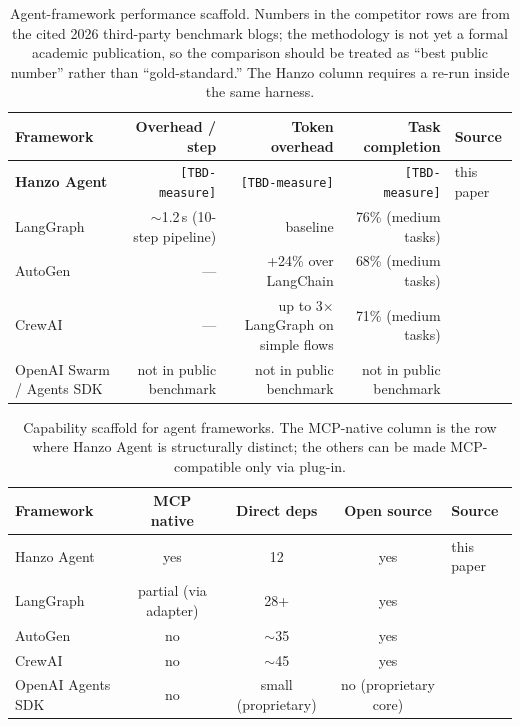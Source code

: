 \begin{table}[H]
\centering
\small
\begin{tabular}{@{}lrrrl@{}}
\toprule
\textbf{Framework} & \textbf{Overhead / step} & \textbf{Token overhead} & \textbf{Task completion} & \textbf{Source} \\
\midrule
\textbf{Hanzo Agent}       & \texttt{[TBD-measure]} & \texttt{[TBD-measure]} & \texttt{[TBD-measure]} & this paper \\
\midrule
LangGraph                  & $\sim$1.2\,s (10-step pipeline) & baseline & 76\% (medium tasks) & \cite{pecollective2026agentframeworks,pooya2026frameworks} \\
AutoGen                    & --- & +24\% over LangChain   & 68\% (medium tasks) & \cite{pecollective2026agentframeworks,pooya2026frameworks} \\
CrewAI                     & --- & up to 3$\times$ LangGraph on simple flows & 71\% (medium tasks) & \cite{pooya2026frameworks} \\
OpenAI Swarm / Agents SDK  & not in public benchmark            & not in public benchmark         & not in public benchmark & \cite{openaiagentssdk} \\
\bottomrule
\end{tabular}
\caption{Agent-framework performance scaffold. Numbers in the competitor
rows are from the cited 2026 third-party benchmark blogs; the methodology
is not yet a formal academic publication, so the comparison should be
treated as ``best public number'' rather than ``gold-standard.'' The
Hanzo column requires a re-run inside the same harness.}
\label{tab:hanzo-agent-comparison}
\end{table}

\begin{table}[H]
\centering
\small
\begin{tabular}{@{}lcccl@{}}
\toprule
\textbf{Framework} & \textbf{MCP native} & \textbf{Direct deps} & \textbf{Open source} & \textbf{Source} \\
\midrule
Hanzo Agent  & yes                & 12              & yes         & this paper \\
LangGraph    & partial (via adapter) & 28+         & yes         & \cite{langgraphgithub} \\
AutoGen      & no                 & $\sim$35        & yes         & \cite{autogengithub} \\
CrewAI       & no                 & $\sim$45        & yes         & \cite{crewaigithub} \\
OpenAI Agents SDK & no            & small (proprietary) & no (proprietary core) & \cite{openaiagentssdk} \\
\bottomrule
\end{tabular}
\caption{Capability scaffold for agent frameworks. The MCP-native column
is the row where Hanzo Agent is structurally distinct; the others can be
made MCP-compatible only via plug-in.}
\label{tab:hanzo-agent-caps}
\end{table}

